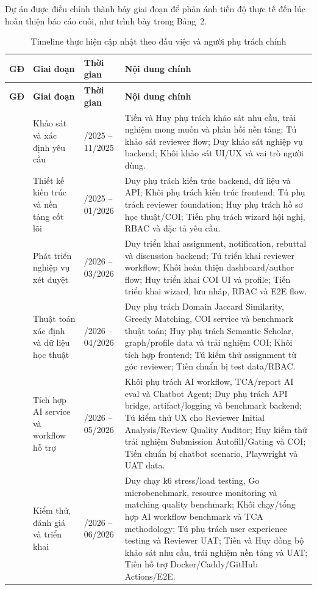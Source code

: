 \documentclass[12pt,a4paper]{article}
\begin{document}
Dự án được điều chỉnh thành bảy giai đoạn để phản ánh tiến độ thực tế đến lúc hoàn thiện báo cáo cuối, như trình bày trong Bảng~2.

\begin{longtable}{|>{\centering\arraybackslash}p{1cm}|>{\raggedright\arraybackslash}p{3.5cm}|>{\centering\arraybackslash}p{2.5cm}|>{\raggedright\arraybackslash}p{6cm}|}
\caption{Timeline thực hiện cập nhật theo đầu việc và người phụ trách chính} \\
\hline
\textbf{GĐ} & \textbf{Giai đoạn} & \textbf{Thời gian} & \textbf{Nội dung chính} \\
\hline
\endfirsthead
\hline
\textbf{GĐ} & \textbf{Giai đoạn} & \textbf{Thời gian} & \textbf{Nội dung chính} \\
\hline
\endhead
1 & Khảo sát và xác định yêu cầu & 10/2025 -- 11/2025 & Tiến và Huy phụ trách khảo sát nhu cầu, trải nghiệm mong muốn và phản hồi nền tảng; Tú khảo sát reviewer flow; Duy khảo sát nghiệp vụ backend; Khôi khảo sát UI/UX và vai trò người dùng. \\
\hline
2 & Thiết kế kiến trúc và nền tảng cốt lõi & 11/2025 -- 01/2026 & Duy phụ trách kiến trúc backend, dữ liệu và API; Khôi phụ trách kiến trúc frontend; Tú phụ trách reviewer foundation; Huy phụ trách hồ sơ học thuật/COI; Tiến phụ trách wizard hội nghị, RBAC và đặc tả yêu cầu. \\
\hline
3 & Phát triển nghiệp vụ xét duyệt & 01/2026 -- 03/2026 & Duy triển khai assignment, notification, rebuttal và discussion backend; Tú triển khai reviewer workflow; Khôi hoàn thiện dashboard/author flow; Huy triển khai COI UI và profile; Tiến triển khai wizard, lưu nháp, RBAC và E2E flow. \\
\hline
4 & Thuật toán xác định và dữ liệu học thuật & 02/2026 -- 04/2026 & Duy phụ trách Domain Jaccard Similarity, Greedy Matching, COI service và benchmark thuật toán; Huy phụ trách Semantic Scholar, graph/profile data và trải nghiệm COI; Khôi tích hợp frontend; Tú kiểm thử assignment từ góc reviewer; Tiến chuẩn bị test data/RBAC. \\
\hline
5 & Tích hợp AI service và workflow hỗ trợ & 03/2026 -- 05/2026 & Khôi phụ trách AI workflow, TCA/report AI eval và Chatbot Agent; Duy phụ trách API bridge, artifact/logging và benchmark backend; Tú kiểm thử UX cho Reviewer Initial Analysis/Review Quality Auditor; Huy kiểm thử trải nghiệm Submission Autofill/Gating và COI; Tiến chuẩn bị chatbot scenario, Playwright và UAT data. \\
\hline
6 & Kiểm thử, đánh giá và triển khai & 05/2026 -- 06/2026 & Duy chạy k6 stress/load testing, Go microbenchmark, resource monitoring và matching quality benchmark; Khôi chạy/tổng hợp AI workflow benchmark và TCA methodology; Tú phụ trách user experience testing và Reviewer UAT; Tiến và Huy đồng bộ khảo sát nhu cầu, trải nghiệm nền tảng và UAT; Tiến hỗ trợ Docker/Caddy/GitHub Actions/E2E. \\

\end{longtable}
\end{document}
